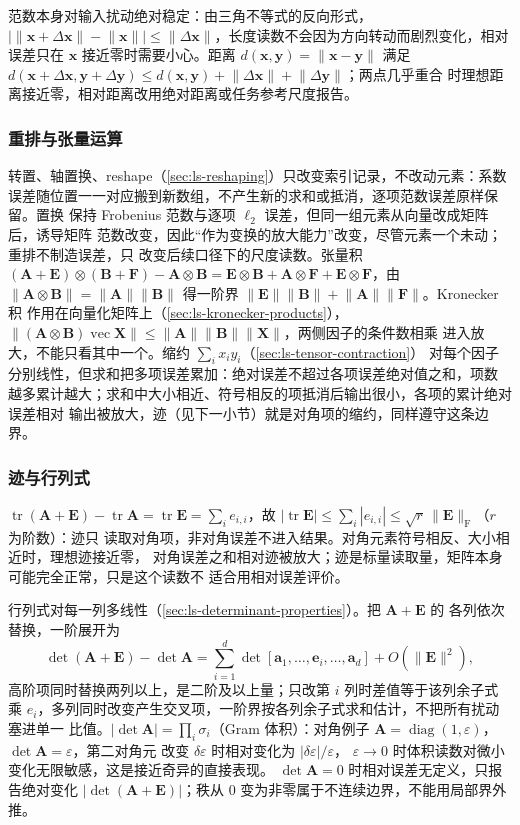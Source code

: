 范数本身对输入扰动绝对稳定：由三角不等式的反向形式，
$\big|\lVert\bm x+\Delta\bm x\rVert-\lVert\bm x\rVert\big|
\leq\lVert\Delta\bm x\rVert$，长度读数不会因为方向转动而剧烈变化，相对误差只在
$\bm x$ 接近零时需要小心。距离 $d(\bm x,\bm y)=\lVert\bm x-\bm y\rVert$ 满足
$d(\bm x+\Delta\bm x,\bm y+\Delta\bm y)
\leq d(\bm x,\bm y)+\lVert\Delta\bm x\rVert+\lVert\Delta\bm y\rVert$；两点几乎重合
时理想距离接近零，相对距离改用绝对距离或任务参考尺度报告。

\subsubsection{重排与张量运算}

转置、轴置换、reshape（\ref{sec:ls-reshaping}）只改变索引记录，不改动元素：系数
误差随位置一一对应搬到新数组，不产生新的求和或抵消，逐项范数误差原样保留。置换
保持 Frobenius 范数与逐项 $\ell_2$ 误差，但同一组元素从向量改成矩阵后，诱导矩阵
范数改变，因此“作为变换的放大能力”改变，尽管元素一个未动；重排不制造误差，只
改变后续口径下的尺度读数。张量积
$(\bm A+\bm E)\otimes(\bm B+\bm F)-\bm A\otimes\bm B
=\bm E\otimes\bm B+\bm A\otimes\bm F+\bm E\otimes\bm F$，由
$\lVert\bm A\otimes\bm B\rVert=\lVert\bm A\rVert\lVert\bm B\rVert$ 得一阶界
$\lVert\bm E\rVert\lVert\bm B\rVert+\lVert\bm A\rVert\lVert\bm F\rVert$。Kronecker 积
作用在向量化矩阵上（\ref{sec:ls-kronecker-products}），
$\lVert(\bm A\otimes\bm B)\operatorname{vec}\bm X\rVert
\leq\lVert\bm A\rVert\lVert\bm B\rVert\lVert\bm X\rVert$，两侧因子的条件数相乘
进入放大，不能只看其中一个。缩约 $\sum_i x_i y_i$（\ref{sec:ls-tensor-contraction}）
对每个因子分别线性，但求和把多项误差累加：绝对误差不超过各项误差绝对值之和，项数
越多累计越大；求和中大小相近、符号相反的项抵消后输出很小，各项的累计绝对误差相对
输出被放大，迹（见下一小节）就是对角项的缩约，同样遵守这条边界。

\subsubsection{迹与行列式}

$\operatorname{tr}(\bm A+\bm E)-\operatorname{tr}\bm A
=\operatorname{tr}\bm E=\sum_i e_{i,i}$，故 $|\operatorname{tr}\bm E|
\leq\sum_i|e_{i,i}|\leq\sqrt r\,\lVert\bm E\rVert_{\mathrm F}$（$r$ 为阶数）：迹只
读取对角项，非对角误差不进入结果。对角元素符号相反、大小相近时，理想迹接近零，
对角误差之和相对迹被放大；迹是标量读取量，矩阵本身可能完全正常，只是这个读数不
适合用相对误差评价。

行列式对每一列多线性（\ref{sec:ls-determinant-properties}）。把 $\bm A+\bm E$ 的
各列依次替换，一阶展开为
\[
 \det(\bm A+\bm E)-\det\bm A
 =\sum_{i=1}^d\det[\bm a_1,\dots,\bm e_i,\dots,\bm a_d]
 +O(\lVert\bm E\rVert^2),
\]
高阶项同时替换两列以上，是二阶及以上量；只改第 $i$ 列时差值等于该列余子式乘
$e_i$，多列同时改变产生交叉项，一阶界按各列余子式求和估计，不把所有扰动塞进单一
比值。$|\det\bm A|=\prod_i\sigma_i$（Gram 体积）：对角例子
$\bm A=\operatorname{diag}(1,\varepsilon)$，$\det\bm A=\varepsilon$，第二对角元
改变 $\delta\varepsilon$ 时相对变化为 $|\delta\varepsilon|/\varepsilon$，
$\varepsilon\to0$ 时体积读数对微小变化无限敏感，这是接近奇异的直接表现。
$\det\bm A=0$ 时相对误差无定义，只报告绝对变化 $|\det(\bm A+\bm E)|$；秩从 $0$
变为非零属于不连续边界，不能用局部界外推。


